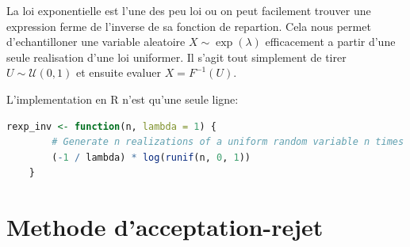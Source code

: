 \documentclass[10pt]{article} %
\begin{document}
La loi exponentielle est l'une des peu loi ou on peut facilement trouver une expression ferme de l'inverse de sa fonction de repartion. Cela nous permet
d'echantilloner une variable aleatoire $X \sim \exp(\lambda)$ efficacement a partir d'une seule realisation d'une loi uniformer. Il s'agit tout
simplement de tirer $U \sim \mathcal{U}(0, 1)$ et ensuite evaluer $X = F^{-1}(U)$.

L'implementation en R n'est qu'une seule ligne:

\begin{lstlisting}[language=R]
    rexp_inv <- function(n, lambda = 1) {
        # Generate n realizations of a uniform random variable n times
        (-1 / lambda) * log(runif(n, 0, 1))
    }
\end{lstlisting}


\section{Methode d'acceptation-rejet}

\begin{figure}[h!]
\centering

\caption{}
\end{figure}
\end{document}
